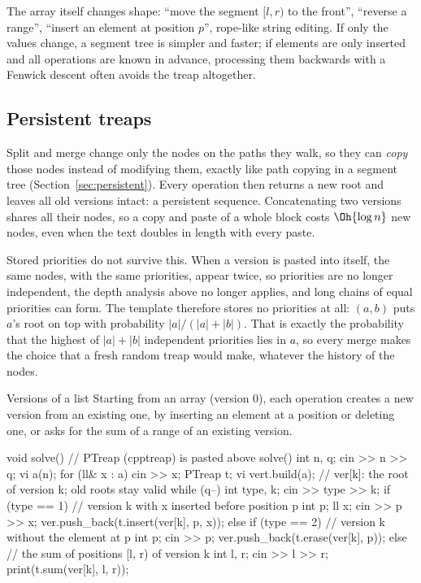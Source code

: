 \begin{recognize}
The array itself changes shape: ``move the segment $[l, r)$ to the front'', ``reverse a range'', ``insert an element at position
$p$'', rope-like string editing. If only the values change, a segment tree is simpler and faster; if elements are only inserted and
all operations are known in advance, processing them backwards with a Fenwick descent often avoids the treap altogether.
\end{recognize}

\subsection{Persistent treaps}\label{sec:ptreap}

Split and merge change only the nodes on the paths they walk, so they can \emph{copy} those nodes instead of modifying them, exactly
like path copying in a segment tree (Section~\ref{sec:persistent}). Every operation then returns a new root and leaves all old
versions intact: a persistent sequence. Concatenating two versions shares all their nodes, so a copy and paste of a whole block costs
$\Oh{\log n}$ new nodes, even when the text doubles in length with every paste.

Stored priorities do not survive this. When a version is pasted into itself, the same nodes, with the same priorities, appear twice,
so priorities are no longer independent, the depth analysis above no longer applies, and long chains of equal priorities can form.
The template therefore stores no priorities at all: $(a, b)$ puts $a$'s root on top with probability $|a| / (|a| + |b|)$.
That is exactly the probability that the highest of $|a| + |b|$ independent priorities lies in $a$, so every merge makes the choice
that a fresh random treap would make, whatever the history of the nodes.

\begin{problem}{Versions of a list}
Starting from an array (version 0), each operation creates a new version from an existing one, by inserting an element at a position
or deleting one, or asks for the sum of a range of an existing version.
\end{problem}

\begin{code}
void solve() {  // PTreap (cpptreap) is pasted above solve()
    int n, q;
    cin >> n >> q;
    vi a(n);
    for (ll& x : a) cin >> x;
    PTreap t;
    vi ver{t.build(a)};  // ver[k]: the root of version k; old roots stay valid
    while (q--) {
        int type, k;
        cin >> type >> k;
        if (type == 1) {  // version k with x inserted before position p
            int p;
            ll x;
            cin >> p >> x;
            ver.push_back(t.insert(ver[k], p, x));
        } else if (type == 2) {  // version k without the element at p
            int p;
            cin >> p;
            ver.push_back(t.erase(ver[k], p));
        } else {  // the sum of positions [l, r) of version k
            int l, r;
            cin >> l >> r;
            print(t.sum(ver[k], l, r));
        }
    }
}
\end{code}

